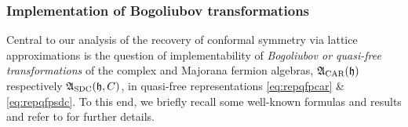 \documentclass[a4paper, 11pt]{article}
\newcommand{\fA}{\mathfrak{A}}\newcommand{\cA}{\mathcal{A}}\newcommand{\dA}{\mathds{A}}\newcommand{\sA}{\mathscr{A}}
\newcommand{\fh}{\mathfrak{h}}
\DeclareMathOperator{\1}{\mathds{1}}
\DeclareMathOperator{\CAR}{\textup{CAR}}
\DeclareMathOperator{\SDC}{\textup{SDC}}
\begin{document}
\subsubsection{Implementation of Bogoliubov transformations}
\label{sec:bogoliubov}
Central to our analysis of the recovery of conformal symmetry via lattice approximations is the question of implementability of \textit{Bogoliubov or quasi-free transformations} of the complex and Majorana fermion algebras, $\fA_{\CAR}(\fh)$ respectively $\fA_{\SDC}(\fh, C)$, in quasi-free representations \eqref{eq:repqfpcar} \& \eqref{eq:repqfpsdc}. To this end, we briefly recall some well-known formulas and results and refer to \cite{ArakiOnQuasiFree, LundbergQuasiFreeSecond, RuijsenaarsOnBogolyubovTransformations2, FredenhagenImplementationOfAutomorphisms, CareyOnFermionGauge, EvansQuantumSymmetriesOn} for further details.
\end{document}
